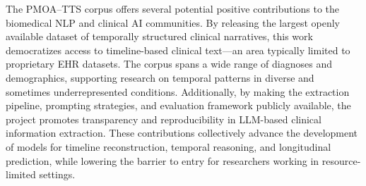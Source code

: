 The PMOA–TTS corpus offers several potential positive contributions to the biomedical NLP and clinical AI communities. By releasing the largest openly available dataset of temporally structured clinical narratives, this work democratizes access to timeline-based clinical text—an area typically limited to proprietary EHR datasets. The corpus spans a wide range of diagnoses and demographics, supporting research on temporal patterns in diverse and sometimes underrepresented conditions. Additionally, by making the extraction pipeline, prompting strategies, and evaluation framework publicly available, the project promotes transparency and reproducibility in LLM-based clinical information extraction. These contributions collectively advance the development of models for timeline reconstruction, temporal reasoning, and longitudinal prediction, while lowering the barrier
to entry for researchers working in resource-limited settings.




